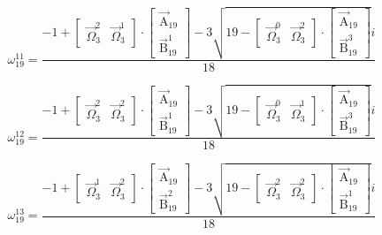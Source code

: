 \documentclass{article}
\begin{document}
\[ \omega_{19}^{11}=\frac{-1+\left[ \begin{matrix} \vec{\Omega}_{3}^{2} & \vec{\Omega}_{3}^{1} \end{matrix} \right]\cdot\left[ \begin{matrix} \vec{\mathrm{A}}_{19} \\ \vec{\mathrm{B}}_{19}^{1} \end{matrix} \right]-3\sqrt{19-\left[ \begin{matrix} \vec{\Omega}_{3}^{0} & \vec{\Omega}_{3}^{2} \end{matrix} \right]\cdot\left[ \begin{matrix} \vec{\mathrm{A}}_{19} \\ \vec{\mathrm{B}}_{19}^{3} \end{matrix} \right]}i}{18} \]

\[ \omega_{19}^{12}=\frac{-1+\left[ \begin{matrix} \vec{\Omega}_{3}^{2} & \vec{\Omega}_{3}^{2} \end{matrix} \right]\cdot\left[ \begin{matrix} \vec{\mathrm{A}}_{19} \\ \vec{\mathrm{B}}_{19}^{1} \end{matrix} \right]-3\sqrt{19-\left[ \begin{matrix} \vec{\Omega}_{3}^{0} & \vec{\Omega}_{3}^{1} \end{matrix} \right]\cdot\left[ \begin{matrix} \vec{\mathrm{A}}_{19} \\ \vec{\mathrm{B}}_{19}^{3} \end{matrix} \right]}i}{18} \]

\[ \omega_{19}^{13}=\frac{-1+\left[ \begin{matrix} \vec{\Omega}_{3}^{1} & \vec{\Omega}_{3}^{2} \end{matrix} \right]\cdot\left[ \begin{matrix} \vec{\mathrm{A}}_{19} \\ \vec{\mathrm{B}}_{19}^{2} \end{matrix} \right]-3\sqrt{19-\left[ \begin{matrix} \vec{\Omega}_{3}^{2} & \vec{\Omega}_{3}^{2} \end{matrix} \right]\cdot\left[ \begin{matrix} \vec{\mathrm{A}}_{19} \\ \vec{\mathrm{B}}_{19}^{1} \end{matrix} \right]}i}{18} \]
\end{document}
